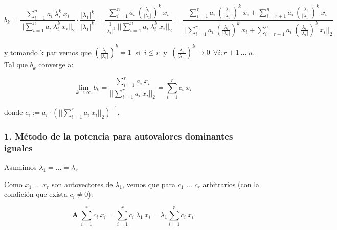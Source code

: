 \begin{equation*} \label{eq_limite}
    b_k = \frac{\sum_{i=1}^{n} a_i \ \lambda_{i}^{k} \ x_i }{||\sum_{i=1}^{n} a_i \ \lambda_{i}^{k} \ x_i||_2} \cdot \frac{|\lambda_1|^k}{|\lambda_1|^k} 
        = \frac{\sum_{i=1}^{n} a_i \ (\frac{\lambda_{i}}{|\lambda_{1}|})^{k} \ x_i}{\frac{1}{|\lambda_{1}|^{k}}\ ||\sum_{i=1}^{n} a_i \ \lambda_{i}^{k} \ x_i||_2}
        = \frac{\sum_{i=1}^{r} a_i\ (\frac{\lambda_{i}}{|\lambda_{1}|})^{k}\ x_i + \sum_{i=r+1}^{n} a_i \ (\frac{\lambda_{i}}{|\lambda_{1}|})^{k} \ x_i }{||\sum_{i=1}^{r} a_i\ (\frac{\lambda_{i}}{|\lambda_{1}|})^{k}\ x_i + \sum_{i=r+1}^{n} a_i \ (\frac{\lambda_{i}}{|\lambda_{1}|})^{k} \ x_i ||_2}
\end{equation*}

\vspace{1em}
\noindent y tomando k par vemos que $(\frac{\lambda_{i}}{|\lambda_{1}|})^k = 1\ $ si $\ i \leq r\ $ y $\ (\frac{\lambda_{i}}{|\lambda_{1}|})^{k} \longrightarrow 0 \ \ \forall i: r + 1\ ...\ n$. Tal que $b_k$ converge a:

\begin{equation*}
    \lim_{k \to \infty} b_k = \frac{\sum_{i=1}^{r} a_i\ x_i }{||\sum_{i=1}^{r} a_i \ x_i||_2} = \sum_{i=1}^{r} c_i\ x_i  
\end{equation*}

\vspace{1em}
\noindent donde $c_i := a_i \cdot (||\sum_{i=1}^{r} a_i \ x_i||_2)^{-1}$. 


\newpage
\vspace{2em}
\subsubsection*{1. Método de la potencia para autovalores dominantes iguales}

Asumimos $\lambda_1 = ... = \lambda_r$

\vspace{1em}
Como $x_1$ ... $x_r$ son autovectores de $\lambda_1$, vemos que para $c_1$ ... $c_r$ arbitrarios (con la condición que exista $c_i \neq 0$):

\begin{equation*}
    \mathbf{A} \ \sum_{i=1}^{r} c_i\ x_i = \sum_{i=1}^{r} c_i\ \lambda_1\ x_i = \lambda_1 \sum_{i=1}^{r} c_i\ x_i
\end{equation*}

